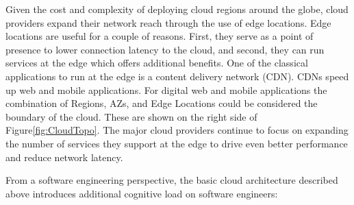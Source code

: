 \documentclass[conference]{IEEEtran}
\begin{document}
Given the cost and complexity of deploying cloud regions around the globe, cloud providers expand their network reach through the use of edge locations.  Edge locations are useful for a couple of reasons. First, they serve as a point of presence to lower connection latency to the cloud, and second, they can run services at the edge which offers additional benefits.  One of the classical applications to run at the edge is a content delivery network (CDN). CDNs speed up web and mobile applications. For digital web and mobile applications the combination of Regions, AZs, and Edge Locations could be considered the boundary of the cloud. These are shown on the right side of Figure\ref{fig:CloudTopo}.  The major cloud providers continue to focus on expanding the number of services they support at the edge to drive even better performance and reduce network latency.     

From a software engineering perspective, the basic cloud architecture described above introduces additional cognitive load on software engineers:
\end{document}
